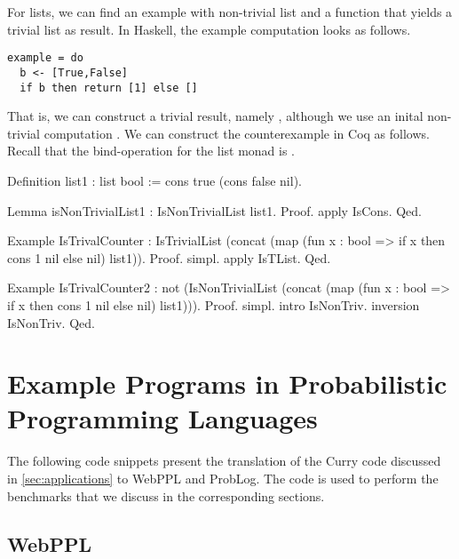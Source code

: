 For lists, we can find an example with non-trivial list and a function  that yields a trivial list as result.
In Haskell, the example computation looks as follows.

\begin{verbatim}
example = do
  b <- [True,False]
  if b then return [1] else []
\end{verbatim}

That is, we can construct a trivial result, namely , although we use an inital non-trivial computation .
We can construct the counterexample in Coq as follows.
Recall that the bind-operation for the list monad is .

\begin{coqcode}
Definition list1 : list bool := cons true (cons false nil).

Lemma isNonTrivialList1 : IsNonTrivialList list1.
Proof.
  apply IsCons.
Qed.

Example IsTrivalCounter :
  IsTrivialList (concat (map (fun x : bool => if x then cons 1 nil else nil) list1)).
Proof.
  simpl. apply IsTList.
Qed.

Example IsTrivalCounter2 :
  not (IsNonTrivialList (concat (map (fun x : bool => if x then cons 1 nil else nil) list1))).
Proof.
  simpl. intro IsNonTriv. inversion IsNonTriv.
Qed.
\end{coqcode}

\section{Example Programs in Probabilistic Programming Languages}
\label{sec:appendix:ppl}

The following code snippets present the translation of the Curry code discussed in \autoref{sec:applications} to WebPPL and ProbLog.
The code is used to perform the benchmarks that we discuss in the corresponding sections.

\subsection*{WebPPL}

